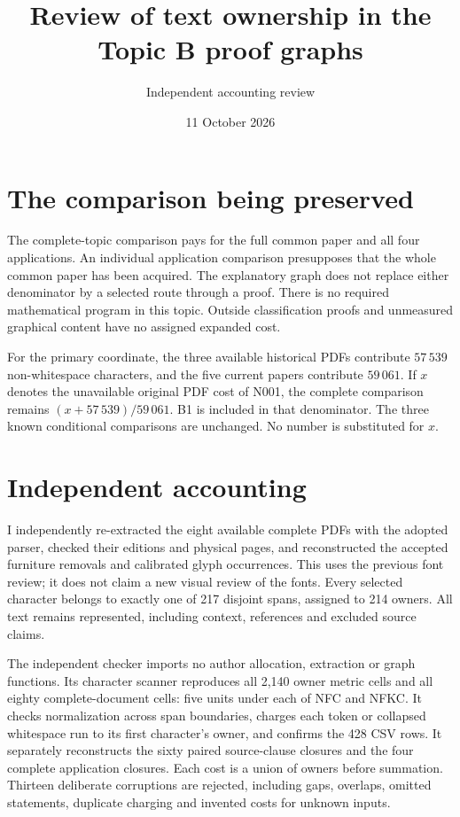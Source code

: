 \documentclass[11pt,a4paper]{article}
\title{Review of text ownership in the Topic B proof graphs}
\author{Independent accounting review}
\date{11 October 2026}
\begin{document}
\maketitle
\section{The comparison being preserved}
The complete-topic comparison pays for the full common paper and all four
applications. An individual application comparison presupposes that the
whole common paper has been acquired. The explanatory graph does not replace
either denominator by a selected route through a proof. There is no required
mathematical program in this topic. Outside classification proofs and
unmeasured graphical content have no assigned expanded cost.

For the primary coordinate, the three available historical PDFs contribute
$57\,539$ non-whitespace characters, and the five current papers contribute
$59\,061$. If $x$ denotes the unavailable original PDF cost of N001, the
complete comparison remains $(x+57\,539)/59\,061$. B1 is included in that
denominator. The three known conditional comparisons are unchanged. No
number is substituted for $x$.

\section{Independent accounting}
I independently re-extracted the eight available complete PDFs with the
adopted parser, checked their editions and physical pages, and reconstructed
the accepted furniture removals and calibrated glyph occurrences. This uses
the previous font review; it does not claim a new visual review of the fonts.
Every selected character belongs to exactly one of 217 disjoint spans,
assigned to 214 owners. All text remains represented, including context,
references and excluded source claims.

The independent checker imports no author allocation, extraction or graph
functions. Its character scanner reproduces all 2,140 owner metric cells
and all eighty complete-document cells: five units under each of NFC and
NFKC. It checks normalization across span boundaries, charges each token or
collapsed whitespace run to its first character's owner, and confirms the
428 CSV rows. It separately reconstructs the sixty paired source-clause
closures and the four complete application closures. Each cost is a union
of owners before summation. Thirteen deliberate corruptions are rejected,
including gaps, overlaps, omitted statements, duplicate charging and
invented costs for unknown inputs.
\end{document}
